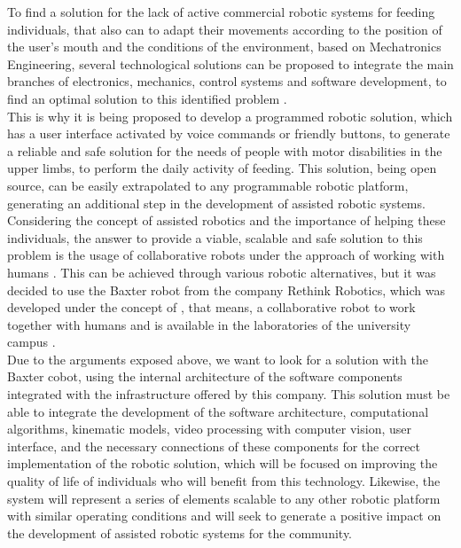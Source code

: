\documentclass[11pt]{report} %
\begin{document}
To find a solution for the lack of active commercial robotic systems for feeding individuals, that also can to adapt their movements according to the position of the user's mouth and the conditions of the environment, based on Mechatronics Engineering, several technological solutions can be proposed to integrate the main branches of electronics, mechanics, control systems and software development, to find an optimal solution to this identified problem \citep{cite_university_eia_general}.\\

This is why it is being proposed to develop a programmed robotic solution, which has a user interface activated by voice commands or friendly buttons, to generate a reliable and safe solution for the needs of people with motor disabilities in the upper limbs, to perform the daily activity of feeding. This solution, being open source, can be easily extrapolated to any programmable robotic platform, generating an additional step in the development of assisted robotic systems.\\

Considering the concept of assisted robotics and the importance of helping these individuals, the answer to provide a viable, scalable and safe solution to this problem is the usage of collaborative robots under the approach of working with humans  \citep{cite_rethink_robotics_baxter_factory_worker}. This can be achieved through various robotic alternatives, but it was decided to use the Baxter robot from the company Rethink Robotics, which was developed under the concept of , that means, a collaborative robot to work together with humans and is available in the laboratories of the university campus \citep{cite_university_eia_general}.\\

Due to the arguments exposed above, we want to look for a solution with the Baxter cobot, using the internal architecture of the software components integrated with the infrastructure offered by this company. This solution must be able to integrate the development of the software architecture, computational algorithms, kinematic models, video processing with computer vision, user interface,  and the necessary connections of these components for the correct implementation of the robotic solution, which will be focused on improving the quality of life of individuals who will benefit from this technology. Likewise, the system will represent a series of elements scalable to any other robotic platform with similar operating conditions and will seek to generate a positive impact on the development of assisted robotic systems for the community.\\
\end{document}
